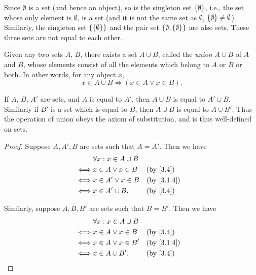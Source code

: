 \begin{eg}\label{3.1.10}
	Since \(\emptyset\) is a set (and hence an object), so is the singleton set \(\left\lbrace\emptyset\right\rbrace\), i.e., the set whose only element is \(\emptyset\), is a set (and it is not the same set as \(\emptyset\), \(\left\lbrace\emptyset\right\rbrace \neq \emptyset\)).
	Similarly, the singleton set \(\left\lbrace\left\lbrace\emptyset\right\rbrace\right\rbrace\) and the pair set \(\left\lbrace\emptyset, \left\lbrace\emptyset\right\rbrace\right\rbrace\) are also sets.
	These three sets are not equal to each other.
\end{eg}

\begin{ax}\label{3.4}
	Given any two sets \(A\), \(B\), there exists a set \(A \cup B\), called the \emph{union} \(A \cup B\) of \(A\) and \(B\), whose elements consist of all the elements which belong to \(A\) or \(B\) or both.
	In other words, for any object \(x\),
	\[
		x \in A \cup B \iff (x \in A \lor x \in B).
	\]
\end{ax}

\setcounter{thm}{11}
\begin{rmk}\label{3.1.12}
	If \(A\), \(B\), \(A'\) are sets, and \(A\) is equal to \(A'\), then \(A \cup B\) is equal to \(A' \cup B\).
	Similarly if \(B'\) is a set which is equal to \(B\), then \(A \cup B\) is equal to \(A \cup B'\).
	Thus the operation of union obeys the axiom of substitution, and is thus well-defined on sets.
\end{rmk}

\begin{proof}
	Suppose \(A, A', B\) are sets such that \(A = A'\).
	Then we have
	\begin{align*}
		     & \forall x : x \in A \cup B                 \\
		\iff & x \in A \lor x \in B       &  & \by{3.4}   \\
		\iff & x \in A' \lor x \in B      &  & \by{3.1.4} \\
		\iff & x \in A' \cup B.           &  & \by{3.4}
	\end{align*}

	Similarly, suppose \(A, B, B'\) are sets such that \(B = B'\).
	Then we have
	\begin{align*}
		     & \forall x : x \in A \cup B                 \\
		\iff & x \in A \lor x \in B       &  & \by{3.4}   \\
		\iff & x \in A \lor x \in B'      &  & \by{3.1.4} \\
		\iff & x \in A \cup B'.           &  & \by{3.4}
	\end{align*}
\end{proof}

